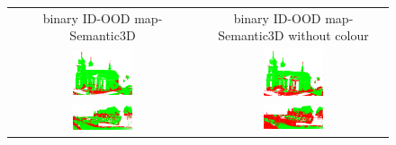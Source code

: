     \begin{figure}[h!]
        \centering
        \begin{tabular}{cc}
            binary ID-OOD map-Semantic3D & binary ID-OOD map-Semantic3D without colour \\
            \includegraphics[width=0.33\textwidth, height=0.18\textheight]{images/ood_imgs/sem3d_of/ent/de_sem3d_OOD_1.pdf}&
            \includegraphics[width=0.33\textwidth, height=0.18\textheight]{images/ood_imgs/sem3d_of/ent/de_sem3d_of_OOD_1.pdf}\\

            \includegraphics[width=0.33\textwidth, height=0.18\textheight]{images/ood_imgs/sem3d_of/ent/de_sem3d_OOD_2.pdf}&
            \includegraphics[width=0.33\textwidth, height=0.18\textheight]{images/ood_imgs/sem3d_of/ent/de_sem3d_of_OOD_2.pdf}\\


\end{tabular}
\end{figure}
